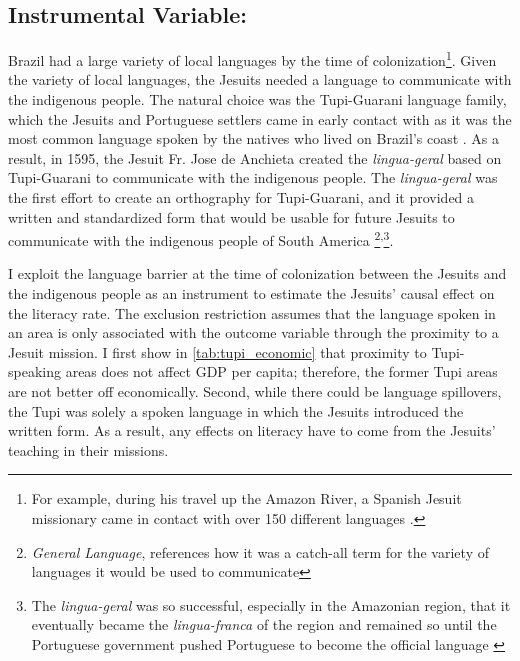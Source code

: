 \documentclass{article}
\begin{document}
\subsection{Instrumental Variable:}

Brazil had a large variety of local languages by the time of colonization\footnote{For example, during his travel up the Amazon River, a Spanish Jesuit missionary came in contact with over 150 different languages \parencite{Mufwene2014-gx}.}. 
Given the variety of local languages, the Jesuits needed a language to communicate with the indigenous people. 
The natural choice was the Tupi-Guarani language family, which the Jesuits and Portuguese settlers came in early contact with as it was the most common language spoken by the natives who lived on Brazil's coast \parencite{McGinness2018-ig}. 
As a result, in 1595, the Jesuit Fr. Jose de Anchieta created the \textit{lingua-geral} based on Tupi-Guarani to communicate with the indigenous people. 
The \textit{lingua-geral} was the first effort to create an orthography for Tupi-Guarani, and it provided a written and standardized form that would be usable for future Jesuits to communicate with the indigenous people of South America \parencites[p.~192]{Newson2020-vg}{McGinness2018-ig}\footnote{
  \textit{General Language}, references how it was a catch-all term for the variety of languages it would be used to communicate}\textsuperscript{,}\footnote{
    The \textit{lingua-geral} was so successful, especially in the Amazonian region, that it eventually became the \textit{lingua-franca} of the region and remained so until the Portuguese government pushed Portuguese to become the official language \parencite{Chambouleyron2019-tm}}.

I exploit the language barrier at the time of colonization between the Jesuits and the indigenous people as an instrument to estimate the Jesuits' causal effect on the literacy rate. 
The exclusion restriction assumes that the language spoken in an area is only associated with the outcome variable through the proximity to a Jesuit mission. 
I first show in \autoref{tab:tupi_economic} that proximity to Tupi-speaking areas does not affect GDP per capita; therefore, the former Tupi areas are not better off economically.
Second, while there could be language spillovers, the Tupi was solely a spoken language in which the Jesuits introduced the written form. 
As a result, any effects on literacy have to come from the Jesuits' teaching in their missions.
\end{document}
